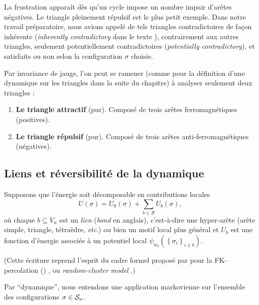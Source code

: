 La frustration apparaît dès qu'un cycle impose un nombre impair d'arêtes négatives. Le triangle pleinement répulsif est le plus petit exemple. Dans notre travail préparatoire, nous avions appelé de tels triangles contradictoires de façon inhérente (\emph{inherently contradictory} dans le texte \cite{BibiMonterey}), contrairement aux autres triangles, seulement potentiellement contradictoires (\emph{potentially contradictory}), et satisfaits ou non selon la configuration $\sigma$ choisie.

Par invariance de jauge, l'on peut se ramener (comme pour la définition d'une dynamique sur les triangles dans la suite du chapitre) à analyser seulement deux triangles :
\begin{enumerate}
    \item \textbf{Le triangle attractif} (pur). Composé de trois arêtes ferromagnétiques (positives).
    \item \textbf{Le triangle répulsif} (pur). Composé de trois arêtes anti-ferromagnétiques (négatives).
\end{enumerate}



\subsection{Liens et réversibilité de la dynamique}
\label{sec:chapII_cluster_abstrait}

Supposons que l'énergie soit décomposable en contributions locales
\begin{equation}
    U(\sigma)=U_0(\sigma)+\sum_{b\in\mathcal B}U_b(\sigma),
    \label{eq:chapII_lien_decomposition}
\end{equation}
où chaque $b\subseteq V_n$ est un \emph{lien} (\emph{bond} en anglais), c'est-à-dire une hyper-arête (arête simple, triangle, tétraèdre, \emph{etc}.) ou bien un motif local plus général et $U_b$ est une fonction d'énergie associée à un potentiel local $\psi_{w_b}\left( \left\{ \sigma_i\right\}_{i \in b}\right)$.

(Cette écriture reprend l'esprit du cadre formel proposé par \ES{} \cite{EdwardsSokal} pour la FK-percolation () \cite{FortuinKasteleyn}, ou  \emph{random-cluster model}  \cite{Grimmett2006}.)

Par ``dynamique'', nous entendons une application markovienne sur l'ensemble des configurations $\sigma \in \mathcal S_n$.


